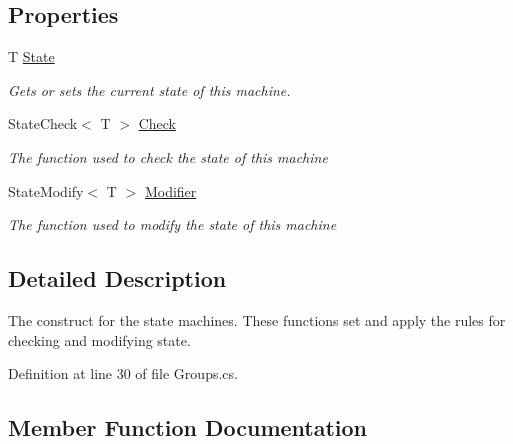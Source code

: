 \subsection*{Properties}
\begin{DoxyCompactItemize}
\item 
T \hyperlink{classHumDrum_1_1Collections_1_1Groups_1_1StateObject_a192fdeea48e27612063d5099456ec217}{State}
\begin{DoxyCompactList}\small\item\em Gets or sets the current state of this machine. \end{DoxyCompactList}\item 
State\+Check$<$ T $>$ \hyperlink{classHumDrum_1_1Collections_1_1Groups_1_1StateObject_aca3a9433c50c52f7364d5239d3847749}{Check}
\begin{DoxyCompactList}\small\item\em The function used to check the state of this machine \end{DoxyCompactList}\item 
State\+Modify$<$ T $>$ \hyperlink{classHumDrum_1_1Collections_1_1Groups_1_1StateObject_a0d961b56d3c86f24a5185cb1812285ac}{Modifier}
\begin{DoxyCompactList}\small\item\em The function used to modify the state of this machine \end{DoxyCompactList}\end{DoxyCompactItemize}


\subsection{Detailed Description}
The construct for the state machines. These functions set and apply the rules for checking and modifying state. 



Definition at line 30 of file Groups.\+cs.



\subsection{Member Function Documentation}
\hypertarget{classHumDrum_1_1Collections_1_1Groups_1_1StateObject_a227e83d9109b0022d195afea296ea0fd}{}

